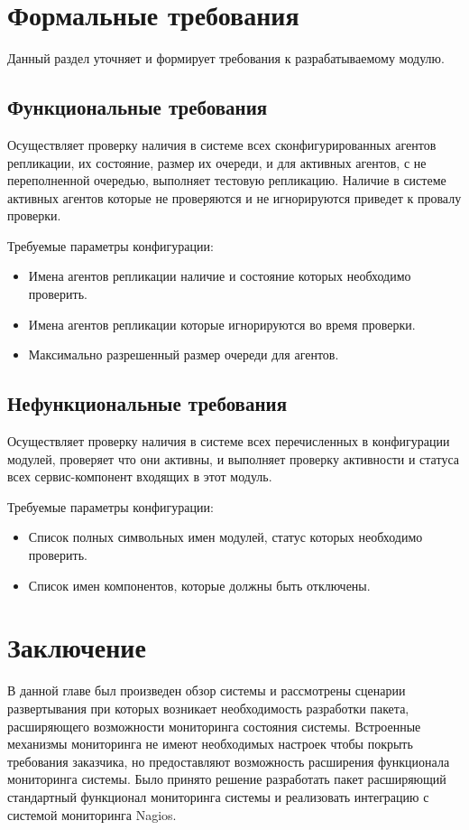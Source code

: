 \section{Формальные требования}
Данный раздел уточняет и формирует требования к разрабатываемому модулю.

\subsection{Функциональные требования}
Осуществляет проверку наличия в системе всех сконфигурированных агентов репликации, их состояние, размер их очереди, и для активных агентов, с не переполненной очередью, выполняет тестовую репликацию. Наличие в системе активных агентов которые не проверяются и не игнорируются приведет к провалу проверки.

Требуемые параметры конфигурации:
\begin{itemize}
\item Имена агентов репликации наличие и состояние которых необходимо проверить.
\item Имена агентов репликации которые игнорируются во время проверки.
\item Максимально разрешенный размер очереди для агентов.
\end{itemize}

\subsection{Нефункциональные требования}
Осуществляет проверку наличия в системе всех перечисленных в конфигурации модулей, проверяет что они активны, и выполняет проверку активности и статуса всех сервис-компонент входящих в этот модуль.

Требуемые параметры конфигурации:
\begin{itemize}
\item Список полных символьных имен модулей, статус которых необходимо проверить.
\item Список имен компонентов, которые должны быть отключены.
\end{itemize}

\section{Заключение}
В данной главе был произведен обзор системы и рассмотрены сценарии развертывания при которых возникает необходимость разработки пакета, расширяющего возможности мониторинга состояния системы. Встроенные механизмы мониторинга не имеют необходимых настроек чтобы покрыть требования заказчика, но предоставляют возможность расширения функционала мониторинга системы. Было принято решение разработать пакет расширяющий стандартный функционал мониторинга системы и реализовать интеграцию с системой мониторинга Nagios.


